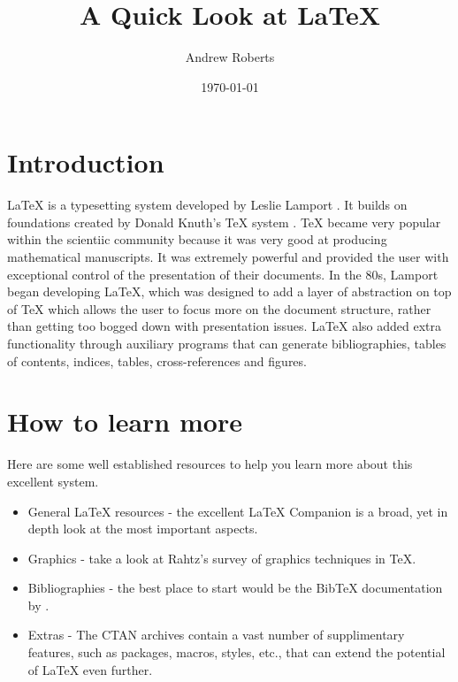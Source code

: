 \documentclass{article}
\newcommand{\BibTeX}{{\sc Bib}\TeX}
\begin{document}
\author{Andrew Roberts}
\title{A Quick Look at \LaTeX}
\date{\today}
\maketitle

\section{Introduction}

\LaTeX{} is a typesetting system developed by Leslie
Lamport \citep{lamport94}.  It builds on foundations created by Donald
Knuth's \TeX{} system \citep{knuth79}.  \TeX{} became very popular within
the scientiic community because it was very good at producing
mathematical manuscripts.  It was extremely powerful and provided the
user with exceptional control of the presentation of their documents.
In the 80s, Lamport began developing \LaTeX, which was designed to add a
layer of abstraction on top of \TeX{} which allows the user to focus
more on the document structure, rather than getting too bogged down with
presentation issues.  \LaTeX{} also added extra functionality through
auxiliary programs that can generate bibliographies, tables of contents,
indices, tables, cross-references and figures.

\section{How to learn more}
Here are some well established resources to help you learn more about
this excellent system.

\begin{itemize}
	
	\item General \LaTeX{} resources - the excellent \LaTeX{}
Companion \citep{goossens93} is a broad, yet in depth look at the most
important aspects.

	\item Graphics - take a look at Rahtz's survey \citep{rahtz89} of graphics
techniques in \TeX. 

	\item Bibliographies - the best place to start would be the
\BibTeX{} documentation by \citet{patashnik88}.

	\item Extras - The CTAN archives\citep{greenwade93} contain a vast
number of supplimentary features, such as packages, macros, styles,
etc., that can extend the potential of \LaTeX{} even further.

\end{itemize}



\end{document}
